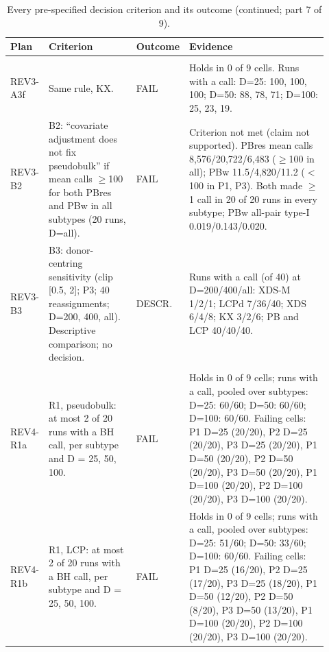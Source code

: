 \begin{table}[p]
\centering\scriptsize
\setlength{\tabcolsep}{2.5pt}\renewcommand{\arraystretch}{1.1}
\caption{Every pre-specified decision criterion and its outcome (continued; part 7 of 9).}\label{tab:criteria7}
\begin{tabular}{@{}>{\raggedright\arraybackslash}p{0.100\linewidth}>{\raggedright\arraybackslash}p{0.285\linewidth}>{\raggedright\arraybackslash}p{0.085\linewidth}>{\raggedright\arraybackslash}p{0.450\linewidth}@{}}
\toprule
Plan & Criterion & Outcome & Evidence \\
\midrule
\multicolumn{4}{@{}>{\raggedright\arraybackslash}p{0.90\linewidth}}{\textbf{Plan 4 (REV3\_PREREG), with amendment 1} (continued)} \\
\cmidrule(lr){1-4}
REV3-A3f & Same rule, KX. & FAIL & Holds in 0 of 9 cells. Runs with a call: D=25: 100, 100, 100; D=50: 88, 78, 71; D=100: 25, 23, 19. \\
REV3-B2 & B2: ``covariate adjustment does not fix pseudobulk'' if mean calls $\ge$100 for both PBres and PBw in all subtypes (20 runs, D=all). & FAIL & Criterion not met (claim not supported). PBres mean calls 8,576/20,722/6,483 ($\ge$100 in all); PBw 11.5/4,820/11.2 ($<$100 in P1, P3). Both made $\ge$1 call in 20 of 20 runs in every subtype; PBw all-pair type-I 0.019/0.143/0.020. \\
REV3-B3 & B3: donor-centring sensitivity (clip [0.5, 2]; P3; 40 reassignments; D=200, 400, all). Descriptive comparison; no decision. & DESCR. & Runs with a call (of 40) at D=200/400/all: XDS-M 1/2/1; LCPd 7/36/40; XDS 6/4/8; KX 3/2/6; PB and LCP 40/40/40. \\
\addlinespace[3pt]
\multicolumn{4}{@{}>{\raggedright\arraybackslash}p{0.90\linewidth}}{\textbf{Plan 5 (REV4\_PREREG), with amendments 1--5}} \\
\cmidrule(lr){1-4}
REV4-R1a & R1, pseudobulk: at most 2 of 20 runs with a BH call, per subtype and D = 25, 50, 100. & FAIL & Holds in 0 of 9 cells; runs with a call, pooled over subtypes: D=25: 60/60; D=50: 60/60; D=100: 60/60. Failing cells: P1 D=25 (20/20), P2 D=25 (20/20), P3 D=25 (20/20), P1 D=50 (20/20), P2 D=50 (20/20), P3 D=50 (20/20), P1 D=100 (20/20), P2 D=100 (20/20), P3 D=100 (20/20). \\
REV4-R1b & R1, LCP: at most 2 of 20 runs with a BH call, per subtype and D = 25, 50, 100. & FAIL & Holds in 0 of 9 cells; runs with a call, pooled over subtypes: D=25: 51/60; D=50: 33/60; D=100: 60/60. Failing cells: P1 D=25 (16/20), P2 D=25 (17/20), P3 D=25 (18/20), P1 D=50 (12/20), P2 D=50 (8/20), P3 D=50 (13/20), P1 D=100 (20/20), P2 D=100 (20/20), P3 D=100 (20/20). \\

\end{tabular}
\end{table}
